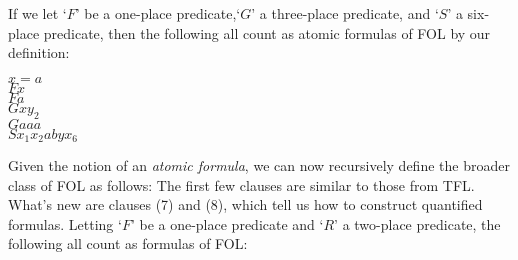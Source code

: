 If we let `$F$' be a one-place predicate,`$G$' a three-place predicate, and `$S$' a six-place predicate, then the following all count as atomic formulas of FOL by our definition:
	\begin{center}
		$x = a$\\
		$Fx$\\
		$Fa$\\
		$Gxy_{2}$\\
		$Gaaa$\\
		$Sx_1 x_2 a b y x_6$\\
	\end{center}
Given the notion of an \emph{atomic formula}, we can now recursively define the broader class of FOL  as follows:
The first few clauses are similar to those from TFL.  What's new are clauses (7) and (8), which tell us how to construct quantified formulas.  Letting `$F$' be a one-place predicate and `$R$' a two-place predicate, the following all count as formulas of FOL:

